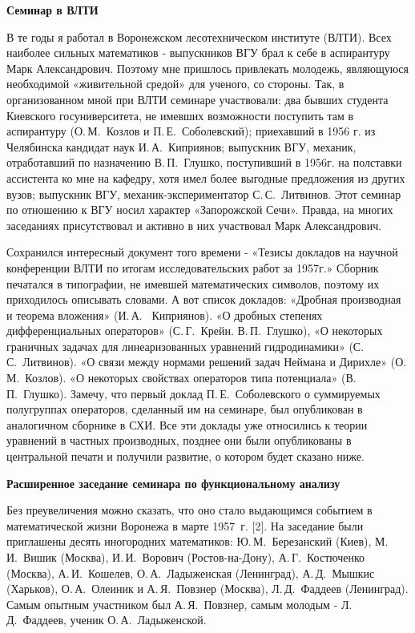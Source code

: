 {\bf Семинар в ВЛТИ}

В те годы я работал в Воронежском лесотехническом институте (ВЛТИ).
Всех наиболее сильных математиков - выпускников ВГУ брал к себе в аспирантуру Марк Александрович.
Поэтому мне пришлось привлекать молодежь, являющуюся необходимой «живительной средой» для ученого, со стороны.
Так, в организованном мной при ВЛТИ семинаре участвовали:
два бывших студента Киевского госуниверситета, не имевших возможности поступить там в аспирантуру
(О.\,М.~Козлов и П.\,Е.~Соболевский); приехавший в 1956 г. из Челябинска кандидат наук И.\,А.~Киприянов;
выпускник ВГУ, механик, отработавший по назначению В.\,П.~Глушко, поступивший в 1956г. на полставки ассистента ко мне на кафедру,
хотя имел более выгодные предложения из других вузов; выпускник ВГУ, механик-экспериментатор С.\,С.~Литвинов. Этот семинар по отношению к ВГУ носил характер «Запорожской Сечи». Правда, на многих заседаниях присутствовал и активно в них участвовал Марк Александрович.

Сохранился интересный документ того времени - «Тезисы докладов на научной конференции ВЛТИ по итогам исследовательских работ за 1957г.» Сборник печатался в типографии, не имевшей математических символов, поэтому их приходилось описывать словами. А вот список докладов: «Дробная производная и теорема вложения» (И.\,А.~ Киприянов). «О дробных степенях дифференциальных операторов» (С.\,Г.~Крейн. В.\,П.~Глушко), «О некоторых граничных задачах для линеаризованных уравнений гидродинамики» (С.\,С.~Литвинов). «О связи между нормами решений задач Неймана и Дирихле» (О.\,М.~Козлов). «О некоторых свойствах операторов типа потенциала» (В.\,П.~Глушко). Замечу, что первый доклад П.\,Е.~Соболевского о суммируемых полугруппах операторов, сделанный им на семинаре, был опубликован в аналогичном сборнике в СХИ. Все эти доклады уже относились к теории уравнений в частных производных, позднее они были опубликованы в центральной печати и получили развитие, о котором будет сказано ниже.

{\bf Расширенное заседание семинара по фу\-н\-к\-ци\-о\-на\-ль\-но\-му анализу}

Без преувеличения можно сказать, что оно стало выдающимся событием в математической жизни Воронежа в марте 1957~г. [2].
На заседание были приглашены десять иногородних математиков:
Ю.\,М.~Березанский (Киев),
М.\,И.~Ви\-шик (Москва), И.\,И.~Ворович (Ростов-на-Дону), А.\,Г.~Костюченко (Москва), А.\,И.~Кошелев,
О.\,А.~Ладыженская (Ленинград), А.\,Д.~Мышкис (Харьков), О.\,А.~Олеиник и
\linebreak
А.\,Я.~По\-в\-з\-нер (Москва),
Л.\,Д.~Фаддеев (Ленинград).
Самым опытным участником был А.\,Я.~Повзнер, самым молодым - Л.\,Д.~Фаддеев, ученик О.\,А.~Ладыженской.

